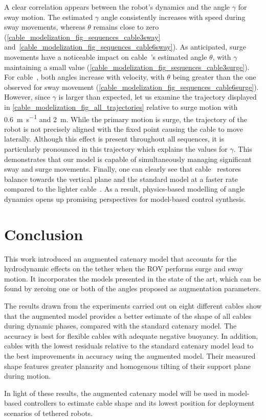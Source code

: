 A clear correlation appears between the robot's dynamics and the angle $\gamma$ for sway motion.
The estimated $\gamma$ angle consistently increases with speed during sway movements, whereas
$\theta$ remains close to zero (\cref{cable_modelization_fig_sequences_cable3sway}
and~\cref{cable_modelization_fig_sequences_cable6sway}). As anticipated, surge movements have a
noticeable impact on cable~'s estimated angle
$\theta$, with $\gamma$ maintaining a small value
(\cref{cable_modelization_fig_sequences_cable3surge}). For
cable~, both angles increase with velocity, with
$\theta$ being greater than the one observed for sway movement
(\cref{cable_modelization_fig_sequences_cable6surge}). However, since $\gamma$ is larger than
expected, let us examine the trajectory displayed in \cref{cable_modelization_fig_all_trajectories}
relative to surge motion with \qty{0.6}{\m\per\s} and \qty{2}{\m}. While the primary motion is
surge, the trajectory of the robot is not precisely aligned with the fixed point causing the cable
to move laterally. Although this effect is present throughout all sequences, it is particularly
pronounced in this trajectory which explains the values for $\gamma$. This demonstrates that our
\thetagammamodel{} model is capable of simultaneously managing significant sway and surge
movements. Finally, one can clearly see that cable~
restores balance towards the vertical plane and the standard model at a faster rate compared to the
lighter cable~. As a result, physics-based modelling
of angle dynamics opens up promising perspectives for model-based control synthesis.

\section{Conclusion}
\label{cable_modelization_sec_conclusion}

This work introduced an augmented catenary model that accounts for the hydrodynamic effects on the
tether when the ROV performs surge and sway motion. It incorporates the models presented in the
state of the art, which can be found by zeroing one or both of the angles proposed as augmentation
parameters.

The results drawn from the experiments carried out on eight different cables show that the
augmented model provides a better estimate of the shape of all cables during dynamic phases,
compared with the standard catenary model. The accuracy is best for flexible cables with adequate
negative buoyancy. In addition, cables with the lowest residuals relative to the standard catenary
model lead to the best improvements in accuracy using the augmented model. Their measured shape
features greater planarity and homogenous tilting of their support plane during motion.

In light of these results, the augmented catenary model will be used in model-based controllers to
estimate cable shape and its lowest position for deployment scenarios of tethered robots.
